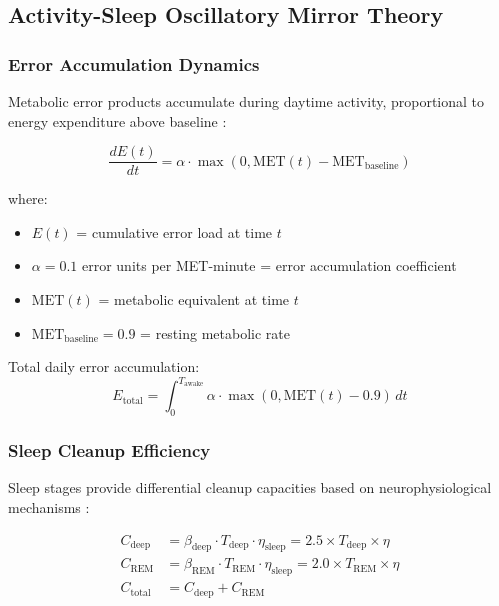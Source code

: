 \documentclass[12pt]{article}
\theoremstyle{remark}
\begin{document}
\subsection{Activity-Sleep Oscillatory Mirror Theory}

\subsubsection{Error Accumulation Dynamics}

Metabolic error products accumulate during daytime activity, proportional to energy expenditure above baseline \citep{bellesi2015effects,tononi2014sleep}:

\begin{equation}
\frac{dE(t)}{dt} = \alpha \cdot \max(0, \text{MET}(t) - \text{MET}_{\text{baseline}})
\end{equation}

where:
\begin{itemize}
\item $E(t)$ = cumulative error load at time $t$
\item $\alpha = 0.1$ error units per MET-minute = error accumulation coefficient
\item $\text{MET}(t)$ = metabolic equivalent at time $t$
\item $\text{MET}_{\text{baseline}} = 0.9$ = resting metabolic rate
\end{itemize}

Total daily error accumulation:
\begin{equation}
E_{\text{total}} = \int_0^{T_{\text{awake}}} \alpha \cdot \max(0, \text{MET}(t) - 0.9) \, dt
\end{equation}

\subsubsection{Sleep Cleanup Efficiency}

Sleep stages provide differential cleanup capacities based on neurophysiological mechanisms \citep{kang2013amyloid,fultz2019coupled}:

\begin{align}
C_{\text{deep}} &= \beta_{\text{deep}} \cdot T_{\text{deep}} \cdot \eta_{\text{sleep}} = 2.5 \times T_{\text{deep}} \times \eta \\
C_{\text{REM}} &= \beta_{\text{REM}} \cdot T_{\text{REM}} \cdot \eta_{\text{sleep}} = 2.0 \times T_{\text{REM}} \times \eta \\
C_{\text{total}} &= C_{\text{deep}} + C_{\text{REM}}
\end{align}
\end{document}
